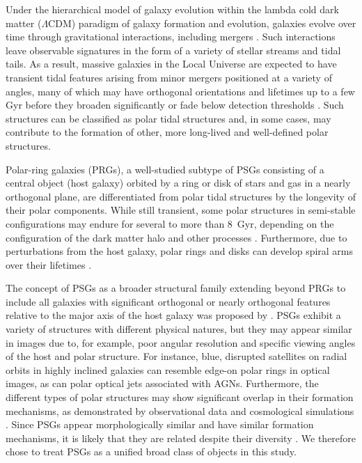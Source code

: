 \documentclass{aa}
\begin{document}
Under the hierarchical model of galaxy evolution within the lambda cold dark matter ($\Lambda$CDM) paradigm of galaxy formation and evolution, galaxies evolve over time through gravitational interactions, including mergers \citep[see e.g.][]{2020NatRP...2...42V}. Such interactions leave observable signatures in the form of a variety of stellar streams and tidal tails. As a result, massive galaxies in the Local Universe are expected to have transient tidal features arising from minor mergers \citep{2010AJ....140..962M, 2023A&A...671A.141M, 2025A&A...700A.176M} positioned at a variety of angles, many of which may have orthogonal orientations and lifetimes up to a few Gyr before they broaden significantly or fade below detection thresholds \citep{2025A&A...700A.176M}. Such structures can be classified as polar tidal structures and, in some cases, may contribute to the formation of other, more long-lived and well-defined polar structures.

Polar-ring galaxies (PRGs), a well-studied subtype of PSGs consisting of a central object (host galaxy) orbited by a ring or disk of stars and gas in a nearly orthogonal plane, are differentiated from polar tidal structures by the longevity of their polar components. While still transient, some polar structures in semi-stable configurations may endure for several to more than $8$~Gyr, depending on the configuration of the dark matter halo and other processes \citep{1990AJ....100.1489W,1993AJ....105.1378P,2003A&A...401..817B,2025PASA...42...56A}. Furthermore, due to perturbations from the host galaxy, polar rings and disks can develop spiral arms over their lifetimes \citep{1997PASA...14...92A, 2006A&A...446..905T}. 

The concept of PSGs as a broader structural family extending beyond PRGs to include all galaxies with significant orthogonal or nearly orthogonal features relative to the major axis of the host galaxy was proposed by \citet{2024A&A...681L..15M}. PSGs exhibit a variety of structures with different physical natures, but they may appear similar in images due to, for example, poor angular resolution and specific viewing angles of the host and polar structure. For instance, blue, disrupted satellites on radial orbits in highly inclined galaxies can resemble edge-on polar rings in optical images, as can polar optical jets associated with AGNs. Furthermore, the different types of polar structures may show significant overlap in their formation mechanisms, as demonstrated by observational data and cosmological simulations \citep{1997ApJ...490L..37B, 1998ApJ...499..635B, 2003A&A...401..817B, 2004AJ....128..137M, 2008ApJ...689..678B, 2012MNRAS.423L..79C, 2019MNRAS.485..464L, 2021MNRAS.504.5702W, 2023MNRAS.519.4735S}. Since PSGs appear morphologically similar and have similar formation mechanisms, it is likely that they are related despite their diversity \citep{2024A&A...681L..15M}. We therefore chose to treat PSGs as a unified broad class of objects in this study. 
\end{document}
